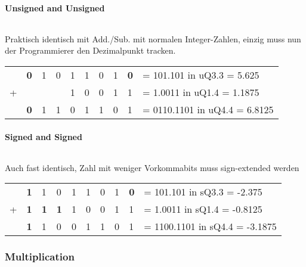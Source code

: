 \paragraph{Unsigned and Unsigned}$~$ \\
\begin{minipage}{0.3\linewidth}
Praktisch identisch mit Add./Sub. mit normalen Integer-Zahlen, einzig muss nun der Programmierer den Dezimalpunkt tracken.
\end{minipage}
\begin{minipage}{0.7\linewidth}
\begin{tabular}{l l l l l l l l l | l}
& \textbf{0} & 1 & 0 & 1 & 1 & 0 & 1 & \textbf{0} & = 101.101 in uQ3.3 = 5.625\\
+ & & & & 1 & 0 & 0 & 1 & 1 & = 1.0011 in uQ1.4 = 1.1875\\
\hline
& \textbf{0} & 1 & 1 & 0 & 1 & 1 & 0 & 1 & = 0110.1101 in uQ4.4 = 6.8125\\
\end{tabular}
\end{minipage}


\paragraph{Signed and Signed}$~$ \\
\begin{minipage}{0.3\linewidth}
Auch fast identisch, Zahl mit weniger Vorkommabits muss sign-extended werden
\end{minipage}
\begin{minipage}{0.7\linewidth}
  \begin{tabular}{l l l l l l l l l | l}
  & \textbf{1} & 1 & 0 & 1 & 1 & 0 & 1 & \textbf{0} & = 101.101 in sQ3.3 = -2.375\\
  + & \textbf{1} & \textbf{1} & \textbf{1} & 1 & 0 & 0 & 1 & 1 & = 1.0011 in sQ1.4 = -0.8125\\
  \hline
  & \textbf{1} & 1 & 0 & 0 & 1 & 1 & 0 & 1 & = 1100.1101 in sQ4.4 = -3.1875\\
  \end{tabular}
\end{minipage}


\subsubsection{Multiplication}
